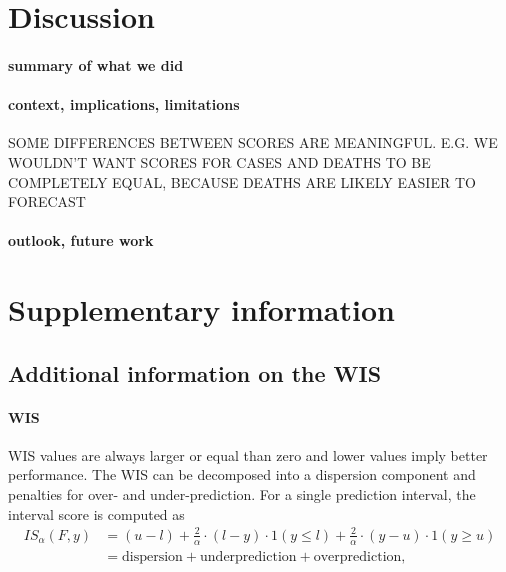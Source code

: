 \documentclass{article}
\begin{document}




\section{Discussion}

\paragraph{summary of what we did}

\paragraph{context, implications, limitations}

SOME DIFFERENCES BETWEEN SCORES ARE MEANINGFUL. E.G. WE WOULDN'T WANT SCORES FOR CASES AND DEATHS TO BE COMPLETELY EQUAL, BECAUSE DEATHS ARE LIKELY EASIER TO FORECAST

\paragraph{outlook, future work}


 




\newpage

\appendix
\section{Supplementary information}


\subsection{Additional information on the WIS} \label{wis}
\paragraph{WIS}

WIS values are always larger or equal than zero and lower values imply better performance. The WIS can be decomposed into a dispersion component and penalties for over- and under-prediction. For a single prediction interval, the interval score is computed as 
\begin{align}
 IS_\alpha(F,y) &= (u-l) + \frac{2}{\alpha} \cdot (l-y) \cdot 1(y \leq l) + \frac{2}{\alpha} \cdot (y-u) \cdot 1(y \geq u) \\
 &= \text{dispersion} + \text{underprediction} + \text{overprediction},    
\end{align}
\end{document}

